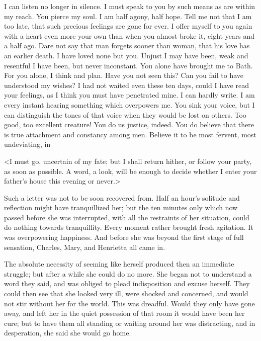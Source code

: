 \begin{mail}{}{}
I can listen no longer in silence. I must speak to you by such means as are within my reach. You pierce my soul. I am half agony, half hope. Tell me not that I am too late, that such precious feelings are gone for ever. I offer myself to you again with a heart even more your own than when you almost broke it, eight years and a half ago. Dare not say that man forgets sooner than woman, that his love has an earlier death. I have loved none but you. Unjust I may have been, weak and resentful I have been, but never inconstant. You alone have brought me to Bath. For you alone, I think and plan. Have you not seen this? Can you fail to have understood my wishes? I had not waited even these ten days, could I have read your feelings, as I think you must have penetrated mine. I can hardly write. I am every instant hearing something which overpowers me. You sink your voice, but I can distinguish the tones of that voice when they would be lost on others. Too good, too excellent creature! You do us justice, indeed. You do believe that there is true attachment and constancy among men. Believe it to be most fervent, most undeviating, in

\end{mail}

<I must go, uncertain of my fate; but I shall return hither, or follow your party, as soon as possible. A word, a look, will be enough to decide whether I enter your father's house this evening or never.>

Such a letter was not to be soon recovered from. Half an hour's solitude and reflection might have tranquillized her; but the ten minutes only which now passed before she was interrupted, with all the restraints of her situation, could do nothing towards tranquillity. Every moment rather brought fresh agitation. It was overpowering happiness. And before she was beyond the first stage of full sensation, Charles, Mary, and Henrietta all came in.

The absolute necessity of seeming like herself produced then an immediate struggle; but after a while she could do no more. She began not to understand a word they said, and was obliged to plead indisposition and excuse herself. They could then see that she looked very ill, were shocked and concerned, and would not stir without her for the world. This was dreadful. Would they only have gone away, and left her in the quiet possession of that room it would have been her cure; but to have them all standing or waiting around her was distracting, and in desperation, she said she would go home.

